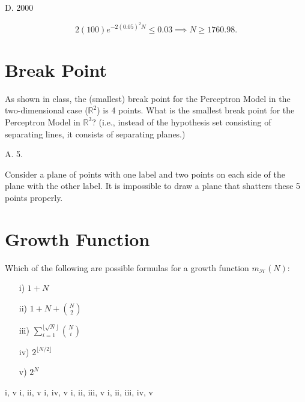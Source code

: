 \documentclass[answers]{exam}
\begin{document}
\begin{questions}
\begin{solution}
D. 2000

\[
2(100)e^{-2(0.05)^2N} \le 0.03 \implies N \ge 1760.98
.\] 
\end{solution}

\section*{Break Point}

\question
As shown in class, the (smallest) break point for the Perceptron Model 
in the two-dimensional case ($\mathbb{R}^2$) is 4 points. What is the 
smallest break point for the Perceptron Model in $\mathbb{R}^3$? (i.e., 
instead of the hypothesis set consisting of separating lines, it 
consists of separating planes.)

\begin{choices}
\end{choices}

\begin{solution}
A. 5.

Consider a plane of points with one label and two points on each side
of the plane with the other label. It is impossible to draw a plane
that shatters these 5 points properly.
\end{solution}

\section*{Growth Function}

\question
Which of the following are possible formulas for a growth function 
$m_\mathcal{H}(N)$:

\begin{itemize}
    \item[i)] $1 + N$
    \item[ii)] $1 + N + \binom{N}{2}$
    \item[iii)] $\sum_{i=1}^{\lfloor \sqrt{N} \rfloor} \binom{N}{i}$
    \item[iv)] $2^{\lfloor N/2 \rfloor}$
    \item[v)] $2^N$
\end{itemize}

\begin{choices}
    \choice i, v
    \choice i, ii, v
    \choice i, iv, v
    \choice i, ii, iii, v
    \choice i, ii, iii, iv, v
\end{choices}


\end{questions}
\end{document}
